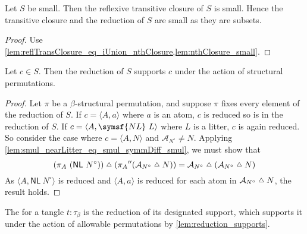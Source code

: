 \begin{lemma}
    Let \( S \) be small.
    Then the reflexive transitive closure of \( S \) is small.
    Hence the transitive closure and the reduction of \( S \) are small as they are subsets.
\end{lemma}
\begin{proof}
    Use \cref{lem:reflTransClosure_eq_iUnion_nthClosure,lem:nthClosure_small}.
\end{proof}
\begin{lemma}
    \label{lem:reduction_supports}
    Let \( c \in S \).
    Then the reduction of \( S \) supports \( c \) under the action of structural permutations.
\end{lemma}
\begin{proof}
    Let \( \pi \) be a \( \beta \)-structural permutation, and suppose \( \pi \) fixes every element of the reduction of \( S \).
    If \( c = \langle A, a \rangle \) where \( a \) is an atom, \( c \) is reduced so is in the reduction of \( S \).
    If \( c = \langle A, \symsf{NL}\ L \rangle \) where \( L \) is a litter, \( c \) is again reduced.
    So consider the case where \( c = \langle A, N \rangle \) and \( \mathcal A_{N^\circ} \neq N \).
    Applying \cref{lem:smul_nearLitter_eq_smul_symmDiff_smul}, we must show that
    \[ (\pi_A\ (\mathsf{NL}\ N^\circ)) \symmdiff ({\pi_A} '' (\mathcal A_{N^\circ} \symmdiff N)) = \mathcal A_{N^\circ} \symmdiff (\mathcal A_{N^\circ} \symmdiff N) \]
    As \( \langle A, \mathsf{NL}\ N^\circ \rangle \) is reduced and \( \langle A, a \rangle \) is reduced for each atom in \( \mathcal A_{N^\circ} \symmdiff N \), the result holds.
\end{proof}
\begin{definition}
    The  for a tangle \( t : \tau_\beta \) is the reduction of its designated support, which supports it under the action of allowable permutations by \cref{lem:reduction_supports}.
\end{definition}
